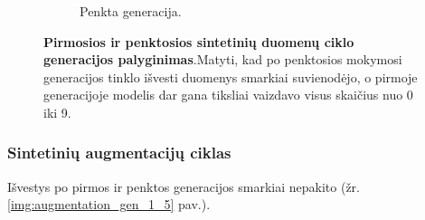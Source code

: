 \documentclass{VUMIFInfKursinis}
\begin{document}
\begin{figure}[H]
\begin{subfigure}[t]{0.45\textwidth}
        \caption{Penkta generacija.}
        \label{img:image2}
    \end{subfigure}
    \caption{\textbf{Pirmosios ir penktosios sintetinių duomenų ciklo generacijos palyginimas}.Matyti, kad po penktosios mokymosi generacijos tinklo išvesti duomenys smarkiai suvienodėjo, o pirmoje generacijoje modelis dar gana tiksliai vaizdavo visus skaičius nuo 0 iki 9.}
    \label{img:sintetiniai_gen_1_5}
\end{figure}

\subsubsection{Sintetinių augmentacijų ciklas}
Išvestys po pirmos ir penktos generacijos smarkiai nepakito (žr. \ref{img:augmentation_gen_1_5} pav.).
\end{document}
